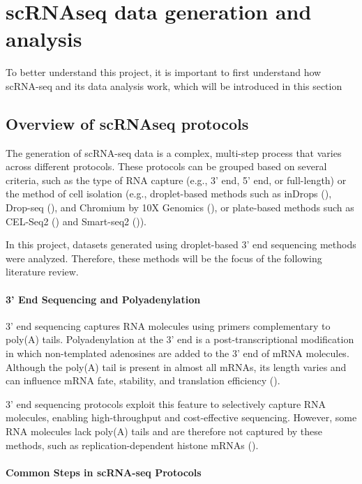 \section{scRNAseq data generation and analysis}

To better understand this project, it is important to first understand how scRNA-seq  and its data analysis work,
which will be introduced in this section

\subsection{Overview of scRNAseq protocols}

The generation of scRNA-seq data is a complex, multi-step process that varies across different protocols.
These protocols can be grouped based on several criteria, such as the type of RNA capture
(e.g., 3' end, 5' end, or full-length) or the method of cell isolation
(e.g., droplet-based methods such as inDrops (\cite{Klein2015}), Drop-seq (\cite{Macosko2015}),
and Chromium by 10X Genomics (\cite{Zheng2017}),
or plate-based methods such as CEL-Seq2 (\cite{Hashimshony2016}) and Smart-seq2 (\cite{Picelli2013})).

In this project, datasets generated using droplet-based 3' end sequencing methods were analyzed.
Therefore, these methods will be the focus of the following literature review.

\paragraph{3' End Sequencing and Polyadenylation}

3' end sequencing captures RNA molecules using primers complementary to poly(A) tails.
Polyadenylation at the 3' end is a post-transcriptional modification
in which non-templated adenosines are added to the 3' end of mRNA molecules.
Although the poly(A) tail is present in almost all mRNAs,
its length varies and can influence mRNA fate, stability, and translation efficiency (\cite{Brouze2022}).

3' end sequencing protocols exploit this feature to selectively capture RNA molecules,
enabling high-throughput and cost-effective sequencing.
However, some RNA molecules lack poly(A) tails and are therefore not captured by these methods,
such as replication-dependent histone mRNAs (\cite{Brouze2022}).

\paragraph{Common Steps in scRNA-seq Protocols}

